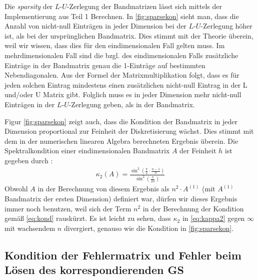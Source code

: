 \documentclass[smallheadings]{scrartcl}
\numberwithin{equation}{section}
\begin{document}
Die \textit{sparsity} der $L$-$U$-Zerlegung der Bandmatrizen lässt sich mittels der Implementierung aus Teil 1 Berechnen. In \ref{fig:sparsekon} sieht man, dass die Anzahl von nicht-null Einträgen in jeder Dimension bei der $L$-$U$-Zerlegung höher ist, als bei der ursprünglichen Bandmatrix. Dies stimmt mit der Theorie überein, weil wir wissen, dass dies für den eindimensionalen Fall gelten muss. Im mehrdimensionalen Fall sind die bzgl. des eindimensionalen Falls zusätzliche Einträge in der Bandmatrix genau die 1-Einträge auf bestimmten Nebendiagonalen. Aus der Formel der Matrixmultiplikation folgt, dass es für jeden solchen Eintrag mindestens einen zusätzlichen nicht-null Eintrag in der L und/oder U Matrix gibt. Folglich muss es in jeder Dimension mehr nicht-null Einträgen in der $L$-$U$-Zerlegung geben, als in der Bandmatrix.

Figur \ref{fig:sparsekon} zeigt auch, dass die Kondition der Bandmatrix in jeder Dimension proportional zur Feinheit der Diskretisierung wächst. Dies stimmt mit dem in der numerischen linearen Algebra berechneten Ergebnis überein. Die Spektralkondition einer eindimensionalen Bandmatrix $A$ der Feinheit $h$ ist gegeben durch \cite{aufg6.2}:
\begin{align}
\kappa_2(A) = \frac{\sin^2(\frac{\pi}{2}\cdot\frac{n-1}{n})}{\sin^2(\frac{\pi}{2n})}
\label{eq:kappa2}
\end{align}
Obwohl $A$ in der Berechnung von diesem Ergebnis als $n^2\cdot A^{(1)}$ (mit $A^{(1)}$ Bandmatrix der ersten Dimension) definiert war, dürfen wir dieses Ergebnis immer noch benutzen, weil sich der Term $n^2$ in der Berechnung der Kondition gemäß \ref{eq:kond} rauskürzt. Es ist leicht zu sehen, dass $\kappa_2$ in \ref{eq:kappa2} gegen $\infty$ mit wachsendem $n$ divergiert, genauso wie die Kondition in \ref{fig:sparsekon}.

%

\subsection{Kondition der Fehlermatrix und Fehler beim Lösen des korrespondierenden GS}
\end{document}
